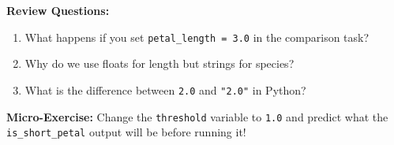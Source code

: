 \textbf{Review Questions:}
\begin{enumerate}
    \item What happens if you set \texttt{petal\_length = 3.0} in the comparison task?
    \item Why do we use floats for length but strings for species?
    \item What is the difference between \texttt{2.0} and \texttt{"2.0"} in Python?
\end{enumerate}

\textbf{Micro-Exercise:} Change the \texttt{threshold} variable to \texttt{1.0} and predict what the \texttt{is\_short\_petal} output will be before running it!
